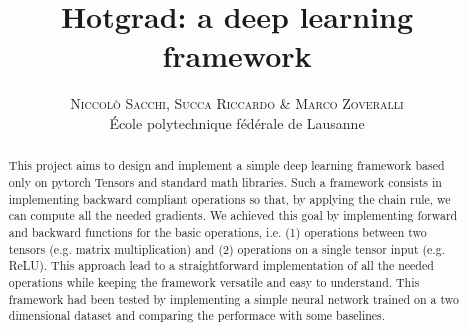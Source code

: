 \documentclass[10pt,conference,compsocconf]{IEEEtran}
\begin{document}
        
\pretitle{\begin{center}\Huge\bfseries} %
\posttitle{\end{center}} %
\title{Hotgrad: a deep learning framework}
\author{
        \textsc{Niccol\`{o} Sacchi, Succa Riccardo \& Marco Zoveralli}
        \normalsize{} \\
        \normalsize \'{E}cole polytechnique f\'{e}d\'{e}rale de Lausanne
}
\maketitle
\begin{abstract}
This project aims to design and implement a simple deep learning framework based only on pytorch Tensors and standard math libraries. Such a framework consists in implementing backward compliant operations so that, by applying the chain rule, we can compute all the needed gradients. We achieved this goal by implementing forward and backward functions for the basic operations, i.e. (1) operations between two tensors (e.g. matrix multiplication) and (2) operations on a single tensor input (e.g. ReLU). This approach lead to a straightforward implementation of all the needed operations while keeping the framework versatile and easy to understand.
This framework had been tested by implementing a simple neural network trained on a two dimensional dataset and comparing the performace with some baselines.
\end{abstract}
\end{document}
